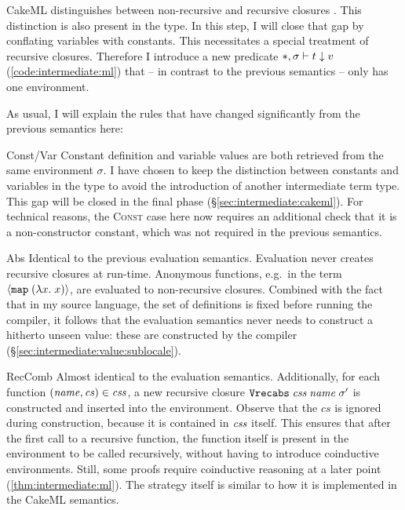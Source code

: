 CakeML distinguishes between non-recursive and recursive closures \cite{myreen2014translation}.
This distinction is also present in the  type.
In this step, I will close that gap by conflating variables with constants.
This necessitates a special treatment of recursive closures.
Therefore I introduce a new predicate $*, \sigma \vdash t \downarrow v$ (\cref{code:intermediate:ml}) that -- in contrast to the previous semantics -- only has one environment.

As usual, I will explain the rules that have changed significantly from the previous semantics here:
\begin{semantics}
  \item[Const/Var]
    Constant definition and variable values are both retrieved from the same environment $\sigma$.
    I have chosen to keep the distinction between constants and variables in the  type to avoid the introduction of another intermediate term type.
    This gap will be closed in the final phase (§\ref{sec:intermediate:cakeml}).
    For technical reasons, the \textsc{Const} case here now requires an additional check that it is a non-constructor constant, which was not required in the previous semantics.
  \item[Abs]
    Identical to the previous evaluation semantics.
    Evaluation never creates recursive closures at run-time.
    Anonymous functions, e.g.\ in the term $\left\langle\texttt{\textup{map}}\;(\lambda x.\;x)\right\rangle$, are evaluated to non-recursive closures.
    Combined with the fact that in my source language, the set of definitions is fixed before running the compiler, it follows that the evaluation semantics never needs to construct a hitherto unseen  value: these are constructed by the compiler (§\ref{sec:intermediate:value:sublocale}).
  \item[RecComb]
    Almost identical to the evaluation semantics.
    Additionally, for each function $(\mathit{name},\mathit{cs}) \in \textit{css}$, a new recursive closure $\texttt{\textup{Vrecabs}}\;\textit{css}\;\mathit{name}\;\sigma'$ is constructed and inserted into the environment.
    Observe that the $\mathit{cs}$ is ignored during construction, because it is contained in $\textit{css}$ itself.
    This ensures that after the first call to a recursive function, the function itself is present in the environment to be called recursively, without having to introduce coinductive environments.
    Still, some proofs require coinductive reasoning at a later point (\cref{thm:intermediate:ml}).
    The strategy itself is similar to how it is implemented in the CakeML semantics.
\end{semantics}

